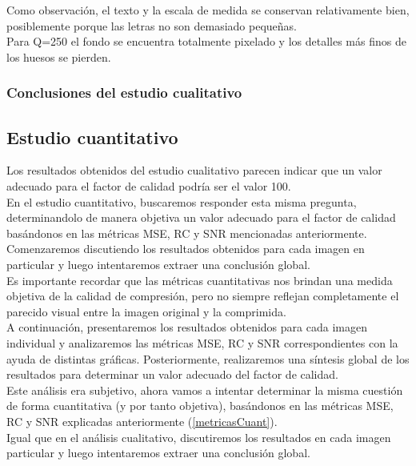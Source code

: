 \documentclass[12pt,a4paper]{article}
\begin{document}
Como observación, el texto y la escala de medida se conservan relativamente bien, posiblemente porque las letras no son demasiado pequeñas.\\

Para Q=250 el fondo se encuentra totalmente pixelado y los detalles más finos de los huesos se pierden.


\subsubsection{Conclusiones del estudio cualitativo}

\newpage
\subsection{Estudio cuantitativo}
Los resultados obtenidos del estudio cualitativo parecen indicar que un valor adecuado para el factor de calidad podría ser el valor 100.\\

En el estudio cuantitativo, buscaremos responder esta misma pregunta, determinandolo de manera objetiva un valor adecuado para el factor de calidad basándonos en las métricas MSE, RC y SNR mencionadas anteriormente. Comenzaremos discutiendo los resultados obtenidos para cada imagen en particular y luego intentaremos extraer una conclusión global.\\

Es importante recordar que las métricas cuantitativas nos brindan una medida objetiva de la calidad de compresión, pero no siempre reflejan completamente el parecido visual entre la imagen original y la comprimida.\\ 

A continuación, presentaremos los resultados obtenidos para cada imagen individual y analizaremos las métricas MSE, RC y SNR correspondientes con la ayuda de distintas gráficas. Posteriormente, realizaremos una síntesis global de los resultados para determinar un valor adecuado del factor de calidad.\\

Este análisis era subjetivo, ahora vamos a intentar determinar la misma cuestión de forma cuantitativa (y por tanto objetiva), basándonos en las métricas MSE, RC y SNR explicadas anteriormente (\ref{metricasCuant}). \\

Igual que en el análisis cualitativo, discutiremos los resultados en cada imagen particular y luego intentaremos extraer una conclusión global.\\
\end{document}
